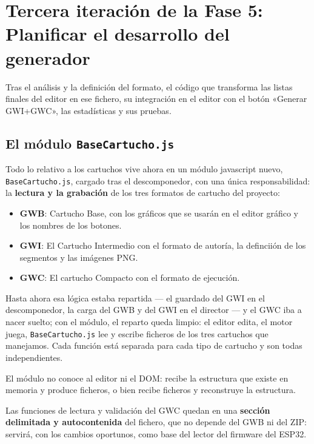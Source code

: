 \section{Tercera iteración de la Fase 5: Planificar el desarrollo del generador}
\label{sec:F5I3}

Tras el análisis y la definición del formato, el código que transforma las listas finales del
editor en ese fichero, su integración en el editor con el botón
«Generar GWI+GWC», las estadísticas y sus pruebas.

\subsection{El módulo \texttt{BaseCartucho.js}}
\label{sec:F5I3Modulo}

Todo lo relativo a los cartuchos vive ahora en un módulo javascript
nuevo, \texttt{BaseCartucho.js}, cargado tras el descomponedor, con
una única responsabilidad: la \textbf{lectura y la grabación} de
los tres formatos de cartucho del proyecto:

\begin{itemize}
	\item \textbf{GWB}: Cartucho Base, con los gráficos que se usarán en el editor gráfico y los nombres de los botones.
	
	\item \textbf{GWI}: El Cartucho Intermedio con el formato de autoría, la definciión de los segmentos y las imágenes PNG.
	
	\item \textbf{GWC}: El cartucho Compacto con el formato de ejecución.
\end{itemize}

Hasta ahora esa lógica
estaba repartida — el guardado del GWI en el descomponedor, la
carga del GWB y del GWI en el director — y el GWC iba a nacer
suelto; con el módulo, el reparto queda limpio: el editor edita,
el motor juega, \texttt{BaseCartucho.js} lee y escribe ficheros de los tres cartuchos que manejamos. Cada función está separada para cada tipo de cartucho y son todas independientes.

El módulo no conoce al editor ni el DOM: recibe la estructura que existe en memoria y produce ficheros, o bien recibe ficheros y reconstruye la estructura.

Las funciones de lectura y validación del GWC quedan en una \textbf{sección delimitada y autocontenida} del fichero, que no depende del GWB ni del ZIP: servirá, con los cambios oportunos, como base del lector del firmware del ESP32.

